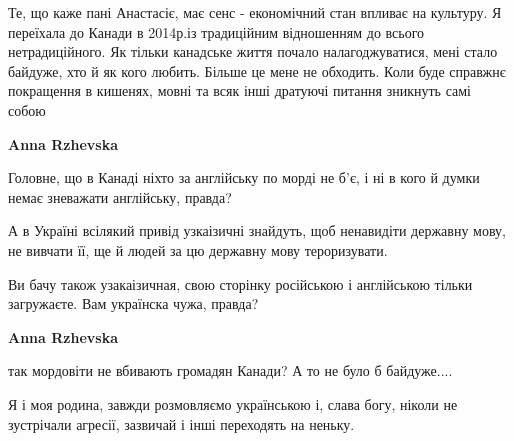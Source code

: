 \begin{itemize}
 

Те, що каже пані Анастасіє, має сенс - економічний стан впливає на культуру. Я
переїхала до Канади в 2014р.із традиційним відношенням до всього
нетрадиційного. Як тільки канадське життя почало налагоджуватися, мені стало
байдуже, хто й як кого любить. Більше це мене не обходить. Коли буде справжнє
покращення в кишенях, мовні та всяк інші дратуючі питання зникнуть самі собою

\begin{itemize}
 
\textbf{Anna Rzhevska} 

Головне, що в Канаді ніхто за англійську по морді не б'є, і ні в кого й думки
немає зневажати англійську, правда?

А в Україні всілякий привід узкаізичні знайдуть, щоб ненавидіти державну мову,
не вивчати її, ще й людей за цю державну мову тероризувати.

Ви бачу також узакаізичная, свою сторінку російською і англійською тільки
загружаєте. Вам українска чужа, правда?


 
\textbf{Anna Rzhevska} 

так мордовіти не вбивають громадян Канади? А то не було б байдуже....
\end{itemize}

 
Я і моя родина, завжди розмовляємо українською і, слава богу, ніколи не
зустрічали агресії, зазвичай і інші переходять на неньку.



\end{itemize}
